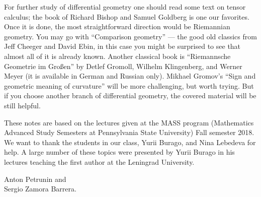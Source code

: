 For further study of differential geometry one should read some text on tensor calculus; the book of Richard Bishop and Samuel Goldberg \cite{bishop-goldberg} is one our favorites.
Once it is done, the most straightforward direction would be Riemannian geometry.
You may go with  ``Comparison geometry'' \cite{cheeger-ebin} --- the good old classics from Jeff Cheeger and David Ebin, in this case you might be surprised to see that almost all of it is already known.
Another classical book is ``Riemannsche Geometrie im Großen'' \cite{gromoll-klingenberg-meyer} by 
Detlef Gromoll,
Wilhelm Klingenberg, 
and  Werner Meyer (it is available in German and Russian only).
Mikhael Gromov's ``Sign and geometric meaning of curvature'' \cite{gromov-1991} will be more challenging, but worth trying.
But if you choose another branch of differential geometry, the covered material will be still helpful.

These notes are based on the lectures given at the MASS program (Mathematics Advanced Study Semesters at Pennsylvania State University) Fall semester 2018.
We want to thank the students in our class, Yurii Burago, and Nina Lebedeva for help.
A large number of these topics were presented by Yurii Burago in his lectures teaching the first author at the Leningrad University.

\begin{flushright}
Anton Petrunin and\\
Sergio Zamora Barrera.
\end{flushright}



\newpage
\tableofcontents
